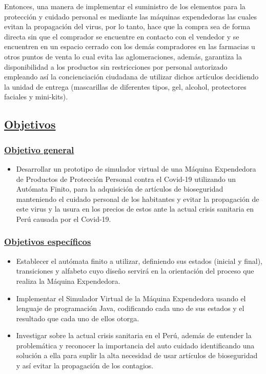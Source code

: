 \documentclass[10pt,conference]{IEEEtran}
\begin{document}
Entonces, una manera de implementar el suministro de los elementos para la protección y cuidado personal es mediante las máquinas expendedoras las cuales evitan la propagación del virus, por lo tanto,  hace que la compra sea de forma directa sin que el comprador se encuentre en contacto con el vendedor y se encuentren en un espacio cerrado con los demás compradores en las farmacias u otros puntos de venta lo cual evita las aglomeraciones, además, garantiza la disponibilidad a los productos sin restricciones por personal autorizado empleando así la concienciación ciudadana de utilizar dichos artículos decidiendo la unidad de entrega (mascarillas de diferentes tipos, gel, alcohol, protectores faciales y mini-kits). 

\subsection{\underline{\textbf{Objetivos}}}

\subsubsection{\underline{\textbf{Objetivo general}}}
\begin{itemize}
\item Desarrollar un prototipo de simulador virtual de una Máquina Expendedora de Productos de Protección Personal contra el Covid-19 utilizando un Autómata Finito, para la adquisición de artículos de bioseguridad manteniendo el cuidado personal de los habitantes y evitar la propagación de este virus y la usura en los precios de estos ante la actual crisis sanitaria en Perú causada por el Covid-19.
\end{itemize}

\subsubsection{\underline{\textbf{Objetivos específicos}}}
\begin{itemize}
    \item Establecer el autómata finito a utilizar, definiendo sus estados (inicial y final), transiciones y alfabeto cuyo diseño servirá en la orientación del proceso que realiza la Máquina Expendedora.
    
    \item Implementar el Simulador Virtual de la Máquina Expendedora usando el lenguaje de programación Java, codificando cada uno de sus estados y el resultado que cada uno de ellos otorga.
    
    \item Investigar sobre la actual crisis sanitaria en el Perú, además de entender la problemática y reconocer la importancia del auto cuidado identificando una solución a ella para suplir la alta necesidad de usar artículos de bioseguridad y así evitar la propagación de los contagios. 

\end{itemize}
\end{document}
